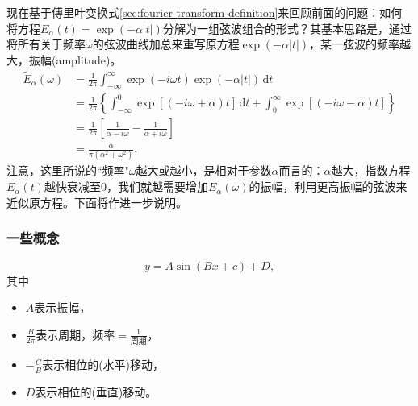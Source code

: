 现在基于傅里叶变换式\eqref{sec:fourier-transform-definition}来回顾前面的问题：如何将方程$E_{\alpha}(t) = \exp \left( - \alpha \left| t \right| \right)$分解为一组弦波组合的形式？其基本思路是，通过将所有关于频率$\omega$的弦波曲线加总来重写原方程$\exp \left( - \alpha \left| t \right| \right)$，某一弦波的频率越大，振幅(amplitude)。
\begin{equation*}
  \begin{split}
    \widetilde{E}_{\alpha} \left( \omega \right)
    & = \frac{1}{2 \pi}
    \int_{-\infty}^{\infty} \exp \left( - i \omega t \right) \exp \left( - \alpha \left| t \right| \right) \, \mathrm{d} t \\
    & = \frac{1}{2 \pi} \left\{
    \int_{-\infty}^{0} \exp \left[ \left( - i \omega + \alpha \right) t \right] \, \mathrm{d} t
    + \int_{0}^{\infty} \exp \left[ \left( - i \omega - \alpha \right) t \right]
    \right\} \\
    & = \frac{1}{2 \pi}
    \left[
    \frac{1}{\alpha - i \omega}
    - \frac{1}{\alpha + i \omega}
    \right] \\
    & = \frac{\alpha}{\pi \left( \alpha^{2} + \omega^{2} \right)},
  \end{split}
\end{equation*}
注意，这里所说的``频率"$\omega$越大或越小，是相对于参数$\alpha$而言的：$\alpha$越大，指数方程$E_{\alpha}(t)$越快衰减至$0$，我们就越需要增加$\widetilde{E}_{\alpha}(\omega)$的振幅，利用更高振幅的弦波来近似原方程。下面将作进一步说明。

\subsubsection{一些概念}
\begin{equation*}
  y = A \sin \left( B x + c \right) + D,
\end{equation*}
其中
\begin{itemize}
  \item $A$表示振幅，
  \item $\frac{B}{2 \pi}$表示周期，$\text{频率} = \frac{1}{\text{周期}}$，
  \item $- \frac{C}{B}$表示相位的(水平)移动，
  \item $D$表示相位的(垂直)移动。
\end{itemize}

